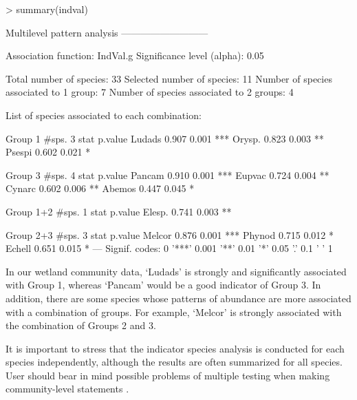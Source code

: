\documentclass[11pt,a4paper]{article}
\begin{document}
\begin{Schunk}
\begin{Sinput}
> summary(indval) 
\end{Sinput}
\begin{Soutput}
 Multilevel pattern analysis
 ---------------------------

 Association function: IndVal.g
 Significance level (alpha): 0.05

 Total number of species: 33
 Selected number of species: 11 
 Number of species associated to 1 group: 7 
 Number of species associated to 2 groups: 4 

 List of species associated to each combination: 

 Group 1  #sps.  3 
        stat p.value    
Ludads 0.907   0.001 ***
Orysp. 0.823   0.003 ** 
Psespi 0.602   0.021 *  

 Group 3  #sps.  4 
        stat p.value    
Pancam 0.910   0.001 ***
Eupvac 0.724   0.004 ** 
Cynarc 0.602   0.006 ** 
Abemos 0.447   0.045 *  

 Group 1+2  #sps.  1 
        stat p.value   
Elesp. 0.741   0.003 **

 Group 2+3  #sps.  3 
        stat p.value    
Melcor 0.876   0.001 ***
Phynod 0.715   0.012 *  
Echell 0.651   0.015 *  
---
Signif. codes:  0 '***' 0.001 '**' 0.01 '*' 0.05 '.' 0.1 ' ' 1 
\end{Soutput}
\end{Schunk}
In our wetland community data, `Ludads' is strongly and significantly associated with Group 1, whereas `Pancam' would be a good indicator of Group 3. In addition, there are some species whose patterns of abundance are more associated with a combination of groups. For example, `Melcor' is strongly associated with the combination of Groups 2 and 3.

It is important to stress that the indicator species analysis is conducted for each species independently, although the results are often summarized for all species. User should bear in mind possible problems of multiple testing when making community-level statements \citep{DeCaceres2009}\citep{Legendre2012}.
\end{document}
